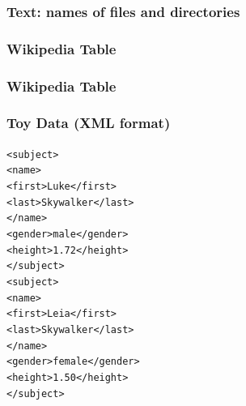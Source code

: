 \documentclass[12pt]{beamer}\usepackage[]{graphicx}\usepackage[]{color}
\makeatletter
\newenvironment{kframe}{%
 \def\at@end@of@kframe{}%
 \ifinner\ifhmode%
  \def\at@end@of@kframe{\end{minipage}}%
  \begin{minipage}{\columnwidth}%
 \fi\fi%
 \def\FrameCommand##1{\hskip\@totalleftmargin \hskip-\fboxsep
 \colorbox{shadecolor}{##1}\hskip-\fboxsep
     \hskip-\linewidth \hskip-\@totalleftmargin \hskip\columnwidth}%
 \MakeFramed {\advance\hsize-\width
   \@totalleftmargin\z@ \linewidth\hsize
   \@setminipage}}%
 {\par\unskip\endMakeFramed%
 \at@end@of@kframe}
\newenvironment{knitrout}{}{} %
\makeatother
\begin{document}

\begin{frame}[fragile]
\frametitle{Text: names of files and directories}
\begin{center}
\end{center}
\end{frame}


\begin{frame}[fragile]
\frametitle{Wikipedia Table}

\begin{center}

\end{center}

\end{frame}


\begin{frame}[fragile]
\frametitle{Wikipedia Table}
\begin{center}
\end{center}
\end{frame}


\begin{frame}
\begin{center}
\Huge{}
\end{center}
\end{frame}


\begin{frame}[fragile]
\frametitle{Toy Data (XML format)}

\begin{knitrout}\footnotesize
{}\color{fgcolor}\begin{kframe}
\begin{alltt}
<subject>
  <name>
    <first>Luke</first>
    <last>Skywalker</last>
  </name>
  <gender>male</gender>
  <height>1.72</height>
</subject>
<subject>
  <name>
    <first>Leia</first>
    <last>Skywalker</last>
  </name>
  <gender>female</gender>
  <height>1.50</height>
</subject>
\end{alltt}
\end{kframe}
\end{knitrout}

\end{frame}
\end{document}
